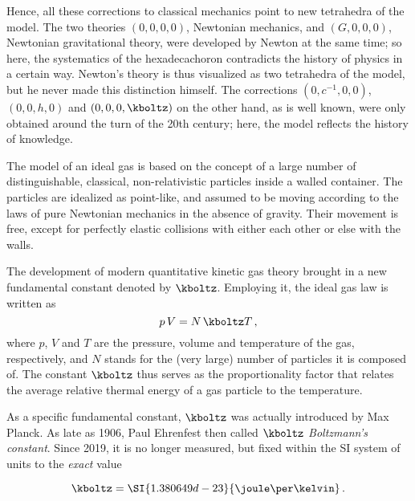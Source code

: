 \documentclass{scrartcl}
\begin{document}
Hence, all these corrections to classical mechanics point to new tetrahedra of the model. The two theories $(0,0,0,0)$, Newtonian mechanics, and $(G,0,0,0)$, Newtonian gravitational theory, were developed by Newton at the same time; so here, the systematics of the hexadecachoron contradicts the history of physics in a certain way. Newton's theory is thus visualized as two tetrahedra of the model, but he never made this distinction himself. The corrections $(0,c^{−1},0,0)$, $(0,0,h,0)$ and $(0,0,0,\kboltz)$ on the other hand, as is well known, were only obtained around the turn of the 20th century; here, the model reflects the history of knowledge.



\newpage {}
\label{sec:0001}

The model of an ideal gas is based on the concept of a large number of distinguishable, classical, non-relativistic particles inside a walled container. The particles are idealized as point-like, and assumed to be moving according to the laws of pure Newtonian mechanics in the absence of gravity. Their movement is free, except for perfectly elastic collisions with either each other or else with the walls.

The development of modern quantitative kinetic gas theory brought in a new fundamental constant denoted by $\kboltz$. Employing it, the ideal gas law is written as
%
\begin{equation*}\label{eq:ideal-kb}
  p\, V=N\, \kboltz T\,,
\end{equation*}
%
where $p$, $V$ and $T$ are the pressure, volume and temperature of the gas, respectively, and $N$ stands for the (very large) number of particles it is composed of. The constant $\kboltz$ thus serves as the proportionality factor that relates the average relative thermal energy of a gas particle to the temperature.

As a specific fundamental constant, $\kboltz$ was actually introduced by Max Planck. As late as 1906, Paul Ehrenfest then called $\kboltz$ \emph{Boltzmann's constant}. Since 2019, it is no longer measured, but fixed within the SI system of units to the \emph{exact} value

\begin{equation*}
  \kboltz=\SI{1.380649d-23}{\joule \per \kelvin}\,.
\end{equation*}
\end{document}
